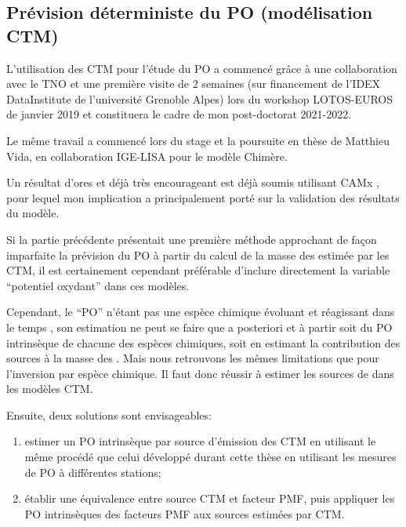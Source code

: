 \subsection{Prévision déterministe du PO (modélisation CTM)}

\begin{tcolorbox}[colback=red!5!white,colframe=Melon,title=Note]
    L'utilisation des CTM pour l'étude du PO a commencé grâce à une collaboration avec le
    TNO et une première visite de 2 semaines (sur financement de l'IDEX DataInstitute de l'université Grenoble Alpes) lors du
    workshop LOTOS-EUROS de janvier 2019 et constituera le cadre de mon post-doctorat 2021-2022.

    Le même travail a commencé lors du stage et la poursuite en thèse de Matthieu Vida, en
    collaboration IGE-LISA pour le modèle Chimère.

    Un résultat d'ores et déjà très encourageant est déjà soumis utilisant CAMx
    \parencite{daellenbachSourcessubmitted}, pour lequel mon implication a principalement
    porté sur la validation des résultats du modèle.
\end{tcolorbox}

Si la partie précédente présentait une première méthode approchant de façon imparfaite la prévision du PO à partir
du calcul de la masse des \PMdix{} estimée par les CTM, il est certainement cependant
préférable d'inclure directement la variable ``potentiel oxydant'' dans ces modèles.

Cependant, le ``PO'' n'étant pas une espèce chimique évoluant et réagissant dans le temps
, son
estimation ne peut se faire que a posteriori et à partir soit du PO intrinsèque de chacune
des espèces chimiques, soit en estimant la contribution des sources à la masse des \PMdix.
Mais nous retrouvons les mêmes limitations que pour l'inversion par espèce chimique. Il faut donc
réussir à estimer les sources de \PMdix{} dans les modèles CTM.

Ensuite, deux solutions sont envisageables:
\begin{enumerate}
    \item estimer un PO intrinsèque par source d'émission des CTM en utilisant le même
        procédé que celui développé durant cette thèse en utilisant les mesures de PO à
        différentes stations;
    \item établir une équivalence entre source CTM et facteur PMF, puis appliquer les
        PO intrinsèques des facteurs PMF aux sources estimées par CTM.
\end{enumerate}

